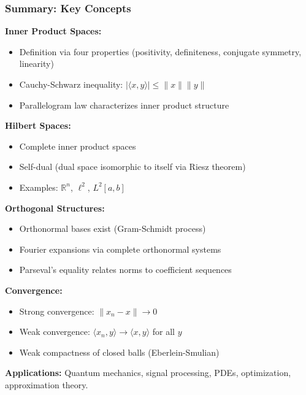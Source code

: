 \documentclass[aspectratio=169,10pt]{beamer}
\begin{document}
\begin{frame}
\frametitle{Summary: Key Concepts}

\textbf{Inner Product Spaces:}
\begin{itemize}
\item Definition via four properties (positivity, definiteness, conjugate symmetry, linearity)
\item Cauchy-Schwarz inequality: $|\langle x, y \rangle| \leq \|x\|\|y\|$
\item Parallelogram law characterizes inner product structure
\end{itemize}

\vspace{0.2cm}

\textbf{Hilbert Spaces:}
\begin{itemize}
\item Complete inner product spaces
\item Self-dual (dual space isomorphic to itself via Riesz theorem)
\item Examples: $\mathbb{R}^n$, $\ell^2$, $L^2[a,b]$
\end{itemize}

\vspace{0.2cm}

\textbf{Orthogonal Structures:}
\begin{itemize}
\item Orthonormal bases exist (Gram-Schmidt process)
\item Fourier expansions via complete orthonormal systems
\item Parseval's equality relates norms to coefficient sequences
\end{itemize}

\vspace{0.2cm}

\textbf{Convergence:}
\begin{itemize}
\item Strong convergence: $\|x_n - x\| \to 0$
\item Weak convergence: $\langle x_n, y \rangle \to \langle x, y \rangle$ for all $y$
\item Weak compactness of closed balls (Eberlein-Smulian)
\end{itemize}

\vspace{0.2cm}

\textbf{Applications:} Quantum mechanics, signal processing, PDEs, optimization, approximation theory.
\end{frame}
\end{document}
